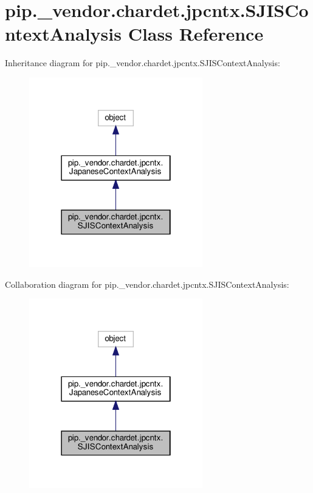 \hypertarget{classpip_1_1__vendor_1_1chardet_1_1jpcntx_1_1SJISContextAnalysis}{}\section{pip.\+\_\+vendor.\+chardet.\+jpcntx.\+S\+J\+I\+S\+Context\+Analysis Class Reference}
\label{classpip_1_1__vendor_1_1chardet_1_1jpcntx_1_1SJISContextAnalysis}


Inheritance diagram for pip.\+\_\+vendor.\+chardet.\+jpcntx.\+S\+J\+I\+S\+Context\+Analysis\+:
\nopagebreak
\begin{figure}[H]
\begin{center}
\leavevmode
\includegraphics[width=214pt]{classpip_1_1__vendor_1_1chardet_1_1jpcntx_1_1SJISContextAnalysis__inherit__graph}
\end{center}
\end{figure}


Collaboration diagram for pip.\+\_\+vendor.\+chardet.\+jpcntx.\+S\+J\+I\+S\+Context\+Analysis\+:
\nopagebreak
\begin{figure}[H]
\begin{center}
\leavevmode
\includegraphics[width=214pt]{classpip_1_1__vendor_1_1chardet_1_1jpcntx_1_1SJISContextAnalysis__coll__graph}
\end{center}
\end{figure}
